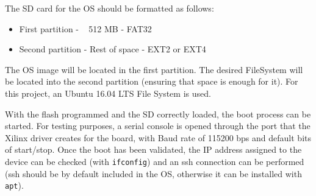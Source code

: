 The SD card for the OS should be formatted as follows:

\begin{itemize}
	\item First partition - ~ 512 MB - FAT32
	\item Second partition - Rest of space - EXT2 or EXT4
\end{itemize}

The OS image will be located in the first partition. The desired FileSystem will be located into the
second partition (ensuring that space is enough for it). For this project, an Ubuntu 16.04 LTS
File System is used.

With the flash programmed and the SD correctly loaded, the boot process can be started. For testing
purposes, a serial console is opened through the port that the Xilinx driver creates for the board,
with Baud rate of 115200 bps and default bits of start/stop. Once the boot has been validated, the
IP address assigned to the device can be checked (with \texttt{ifconfig}) and an ssh connection can
be performed (ssh should be by default included in the OS, otherwise it can be installed with
\texttt{apt}).

